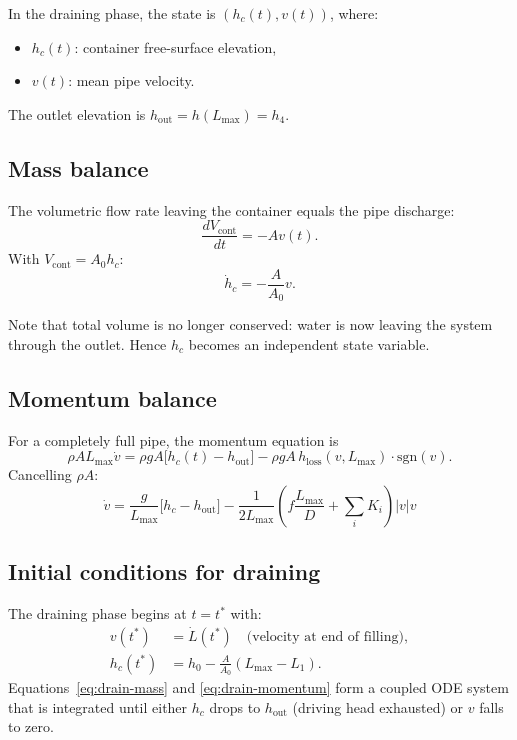 \documentclass[11pt]{article}
\theoremstyle{definition}
\begin{document}
In the draining phase, the state is $(h_c(t), v(t))$, where:
\begin{itemize}[nosep]
  \item $h_c(t)$: container free-surface elevation,
  \item $v(t)$: mean pipe velocity.
\end{itemize}
The outlet elevation is $h_{\text{out}} = h(L_{\max}) = h_4$.

\subsection{Mass balance}

The volumetric flow rate leaving the container equals the pipe discharge:
\[
  \frac{dV_{\text{cont}}}{dt} = -A v(t).
\]
With $V_{\text{cont}} = A_0 h_c$:
\begin{equation}
  \boxed{\dot{h}_c = -\frac{A}{A_0} v.}
  \label{eq:drain-mass}
\end{equation}

Note that total volume is no longer conserved: water is now leaving the system through 
the outlet. Hence $h_c$ becomes an independent state variable.

\subsection{Momentum balance}

For a completely full pipe, the momentum equation is
\[
  \rho A L_{\max} \dot{v} = \rho g A\bigl[h_c(t) - h_{\text{out}}\bigr]
                           - \rho g A\, h_{\text{loss}}(v, L_{\max}) \cdot \text{sgn}(v).
\]
Cancelling $\rho A$:
\begin{equation}
  \boxed{\dot{v} = \frac{g}{L_{\max}}\bigl[h_c - h_{\text{out}}\bigr]
         - \frac{1}{2L_{\max}}\left(f \frac{L_{\max}}{D} + \sum_i K_i\right) |v| v}
  \label{eq:drain-momentum}
\end{equation}

\subsection{Initial conditions for draining}

The draining phase begins at $t = t^*$ with:
\begin{align}
  v(t^*) &= \dot{L}(t^*) \quad \text{(velocity at end of filling)}, \label{eq:drain-IC-v} \\
  h_c(t^*) &= h_0 - \frac{A}{A_0}(L_{\max} - L_1). \label{eq:drain-IC-hc}
\end{align}
Equations~\eqref{eq:drain-mass} and \eqref{eq:drain-momentum} form a coupled ODE system 
that is integrated until either $h_c$ drops to $h_{\text{out}}$ (driving head exhausted) 
or $v$ falls to zero.
\end{document}
